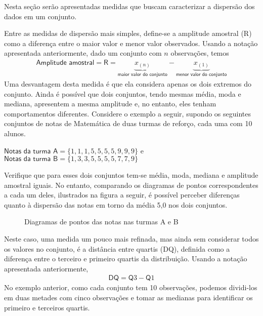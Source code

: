 Nesta seção serão apresentadas medidas que buscam caracterizar a dispersão dos dados em um conjunto.


Entre as medidas de dispersão mais simples, define-se a amplitude amostral (R) como a diferença entre o maior valor e menor valor observados. Usando a notação apresentada anteriormente, dado um conjunto com \(n\) observações, temos
\begin{equation*}
\begin{split}\textsf{Amplitude amostral}=\textsf{R}= \underbrace{x_{(n)}}_{\textsf{maior valor do conjunto}}-\underbrace{x_{(1)}}_{\textsf{menor valor do conjunto}}\end{split}
\end{equation*}
Uma desvantagem desta medida é que ela considera apenas os dois extremos do conjunto. Ainda é possível que dois conjuntos, tendo mesmas média, moda e mediana, apresentem a mesma amplitude e, no entanto, eles tenham comportamentos diferentes. Considere o exemplo a seguir, supondo os seguintes conjuntos de notas de Matemática de duas turmas de reforço, cada uma com 10 alunos.

\(\textsf{Notas da turma A}=\{ 1,1,1,5,5,5,5,9,9,9\}\) e \(\textsf{Notas da turma B}=\{1,3,3,5,5,5,5,7,7,9\}\)

Verifique que para esses dois conjuntos tem-se média, moda, mediana e amplitude amostral iguais. No entanto, comparando os diagramas de pontos correspondentes a cada um deles, ilustrados na figura a seguir, é possível perceber diferenças quanto à dispersão das notas em torno da média 5,0 nos dois conjuntos.

\begin{figure}[H]
\centering
\capstart

\noindent{}
\caption{Diagramas de pontos das notas nas turmas A e B}\label{\detokenize{PE104-4:fig-diagrama-de-pontos-notas}}\label{\detokenize{PE104-4:id2}}\end{figure}

Neste caso, uma medida um pouco mais refinada, mas ainda sem considerar todos os valores no conjunto, é a distância entre quartis (DQ), definida como a diferença entre o terceiro e primeiro quartis da distribuição. Usando a notação apresentada anteriormente,
\begin{equation*}
\begin{split}\textsf{DQ}=\textsf{Q}3-\textsf{Q}1\end{split}
\end{equation*}
No exemplo anterior, como cada conjunto tem 10 observações, podemos dividi-los em duas metades com cinco observações e tomar as medianas para identificar os primeiro e terceiros quartis.

